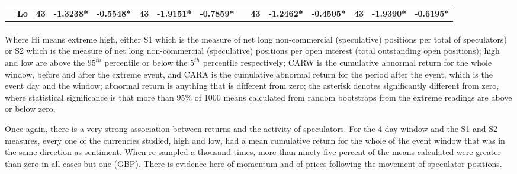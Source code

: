 \documentclass[preprint,12pt,authoryear]{elsarticle}
\begin{document}
\begin{table}
\begin{threeparttable}
\begin{tabular}{llccccccccccccc}
& Lo & 43 &-1.3238* & -0.5548* & 43 & -1.9151* & -0.7859* & & 43 & -1.2462* & -0.4505*  &43 & -1.9390*  & -0.6195*  \\
\hline
\label{tabref:SP1}
\end{tabular}
\begin{tablenotes}
\small 
\item Where Hi means extreme high, either S1 which is the measure of net long non-commercial (speculative) positions per total of speculators) or S2 which is the measure of net long non-commercial (speculative) positions per open interest (total outstanding open positions); high and low are above the $95^{th}$ percentile or below the $5^{th}$ percentile respectively; CARW is the cumulative abnormal return for the whole window, before and after the extreme event, and CARA is the cumulative abnormal return for the period after the event, which is the event day and the window; abnormal return is anything that is different from zero; the asterisk denotes significantly different from zero, where statistical significance is that more than 95\% of 1000 means calculated from random bootstraps from the extreme readings are above or below zero.   
\end{tablenotes}	
\end{threeparttable}  
\end{table}

Once again, there is a very strong association between returns and the activity of speculators.  For the 4-day window and the S1 and S2 measures, every one of the currencies studied, high and low, had a mean cumulative return for the whole of the event window that was in the same direction as sentiment.  When re-sampled a thousand times, more than ninety five percent of the means calculated were greater than zero in all cases but one (GBP).  There is evidence here of momentum and of prices following the movement of speculator positions. 
\end{document}
